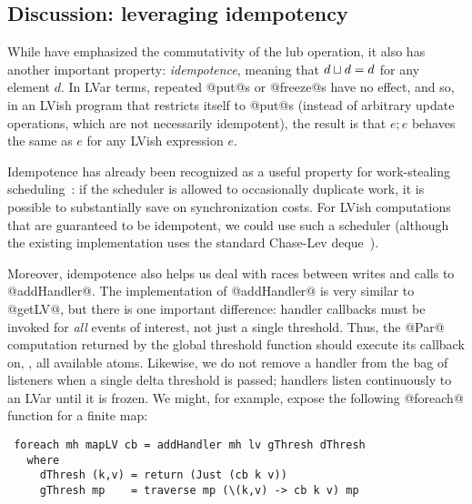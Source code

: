 \subsection{Discussion: leveraging idempotency}
\label{subsection:lvish-discussion-leveraging-idempotency}
\ifdefined\DISSERTATION

While  have emphasized the commutativity of the lub operation, it
also has another important property: \emph{idempotence}, meaning that
$d \sqcup d = d$ for any element $d$.  In LVar terms, repeated
@put@s or @freeze@s have no effect, and so, in an LVish program that
restricts itself to @put@s (instead of arbitrary update operations,
which are not necessarily idempotent), the result is that $e; e$
behaves the same as $e$ for any LVish expression $e$.

Idempotence has already been recognized as a useful property for
work-stealing scheduling~\cite{idempotent}: if the scheduler is
allowed to occasionally duplicate work, it is possible to
substantially save on synchronization costs.  For LVish computations
that are guaranteed to be idempotent, we could use such a scheduler
(although the existing implementation uses the standard Chase-Lev
deque~\cite{ChaseLev}).

Moreover, idempotence also helps us deal with races between writes and
calls to @addHandler@.  The implementation of @addHandler@ is very
similar to @getLV@, but there is one important difference: handler
callbacks must be invoked for \emph{all} events of interest, not just
a single threshold.  Thus, the @Par@ computation returned by the
global threshold function should execute its callback on, \eg, all
available atoms.  Likewise, we do not remove a handler from the bag of
listeners when a single delta threshold is passed; handlers listen
continuously to an LVar until it is frozen.  We might, for example,
expose the following @foreach@ function for a finite map:

\singlespacing
\begin{lstlisting}
 foreach mh mapLV cb = addHandler mh lv gThresh dThresh
   where
     dThresh (k,v) = return (Just (cb k v))
     gThresh mp    = traverse mp (\(k,v) -> cb k v) mp
\end{lstlisting}
\doublespacing

\fi


